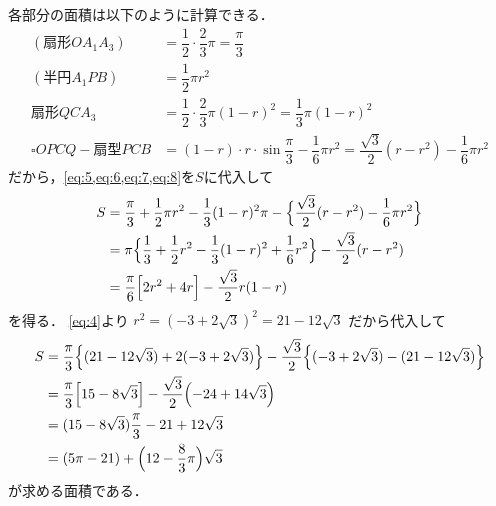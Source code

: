 \documentclass[../../main.tex]{subfiles}
\begin{document}
各部分の面積は以下のように計算できる．
\begin{align}
  (\text{扇形}OA_1A_3) &= \dfrac{1}{2} \cdot \dfrac{2}{3}\pi = \dfrac{\pi}{3} \label{eq:5} \\
  (\text{半円}A_1PB)   &= \dfrac{1}{2}\pi r^2 \label{eq:6} \\
  \text{扇形}Q C A_3   &=\dfrac{1}{2} \cdot \dfrac{2}{3}\pi (1-r)^2 = \dfrac{1}{3}\pi(1-r)^2 \label{eq:7} \\
  \square OPCQ -\text{扇型}PCB &= (1-r) \cdot r \cdot \sin \dfrac{\pi}{3} - \dfrac{1}{6}\pi r^2 = \dfrac{\sqrt{3}}{2}(r - r^2) - \dfrac{1}{6}\pi r^2 \label{eq:8}
\end{align}
だから，\cref{eq:5,eq:6,eq:7,eq:8}を$S$に代入して
\begin{align}
  S &= \dfrac{\pi}{3} + \dfrac{1}{2}\pi r^2 - \dfrac{1}{3}(1-r)^2\pi - \Bigl\{ \dfrac{\sqrt{3}}{2}(r-r^2) - \dfrac{1}{6}\pi r^2 \Bigr\} \\
  &= \pi \Bigl\{ \dfrac{1}{3} + \dfrac{1}{2}r^2 - \dfrac{1}{3}(1-r)^2 + \dfrac{1}{6}r^2 \Bigr\} - \dfrac{\sqrt{3}}{2}(r-r^2) \\
  &= \dfrac{\pi}{6} \Bigl[ 2r^2 + 4r \Bigr] - \dfrac{\sqrt{3}}{2} r (1-r)
\end{align}
を得る．
\cref{eq:4}より $r^2 = (-3+2\sqrt{3})^2 = 21 - 12\sqrt{3}$ だから代入して
\begin{align}
  S
  &= \dfrac{\pi}{3} \Bigl\{ (21 - 12\sqrt{3}) + 2(-3 + 2\sqrt{3}) \Bigr\} - \dfrac{\sqrt{3}}{2} \Bigl\{ (-3 + 2\sqrt{3}) - (21 - 12\sqrt{3}) \Bigr\} \\
  &= \dfrac{\pi}{3} \Bigl[ 15 - 8\sqrt{3} \Bigr] - \dfrac{\sqrt{3}}{2} \Bigl( -24 + 14\sqrt{3} \Bigr) \\
  &= (15 - 8\sqrt{3})\dfrac{\pi}{3} - 21 + 12\sqrt{3} \\
  &= (5\pi - 21) + \Bigl( 12 - \dfrac{8}{3}\pi \Bigr)\sqrt{3}
\end{align}
が求める面積である．

\newpage
\end{document}
